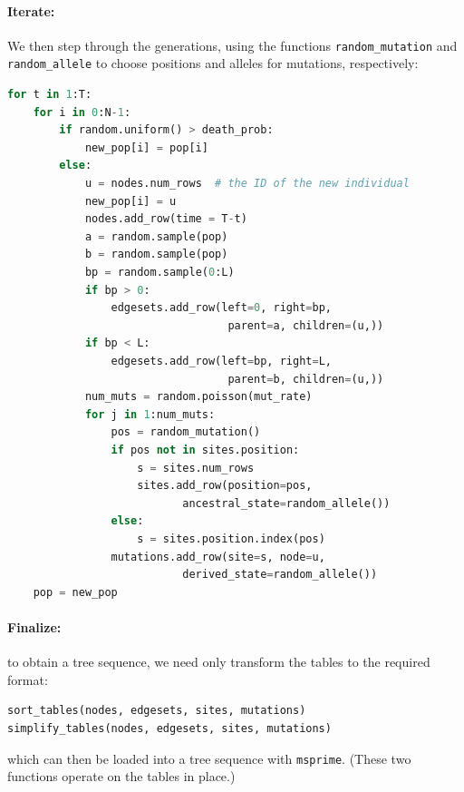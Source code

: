 \documentclass{article}
\newcommand{\msprime}{\texttt{msprime}}
\begin{document}
\paragraph{Iterate:}
We then step through the generations,
using the functions \texttt{random\_mutation} and \texttt{random\_allele}
to choose positions and alleles for mutations, respectively:
\begin{lstlisting}[language=Python]
for t in 1:T:
    for i in 0:N-1:
        if random.uniform() > death_prob:
            new_pop[i] = pop[i]
        else:
            u = nodes.num_rows  # the ID of the new individual
            new_pop[i] = u
            nodes.add_row(time = T-t)
            a = random.sample(pop)
            b = random.sample(pop)
            bp = random.sample(0:L)
            if bp > 0:
                edgesets.add_row(left=0, right=bp,
                                  parent=a, children=(u,))
            if bp < L:
                edgesets.add_row(left=bp, right=L,
                                  parent=b, children=(u,))
            num_muts = random.poisson(mut_rate)
            for j in 1:num_muts:
                pos = random_mutation()
                if pos not in sites.position:
                    s = sites.num_rows
                    sites.add_row(position=pos,
                           ancestral_state=random_allele())
                else:
                    s = sites.position.index(pos)
                mutations.add_row(site=s, node=u,
                           derived_state=random_allele())
    pop = new_pop
\end{lstlisting}

\paragraph{Finalize:}
to obtain a tree sequence, we need only transform the tables to the required format:
\begin{lstlisting}
sort_tables(nodes, edgesets, sites, mutations)
simplify_tables(nodes, edgesets, sites, mutations)
\end{lstlisting}
which can then be loaded into a tree sequence with \msprime.
(These two functions operate on the tables in place.)
\end{document}

